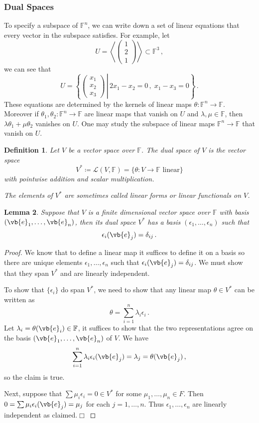 \documentclass{article}
\theoremstyle{plain}\theoremheaderfont{\normalfont\itshape}\theorembodyfont{\rmfamily}\theoremseparator{.}\newtheorem*{rem}{Remark}\newtheorem*{ex}{Example}\newtheorem*{proof}{Proof}\newtheorem*{altp}{Alternative proof}
\theoremstyle{plain}\theoremheaderfont{\normalfont\bfseries}\theorembodyfont{\rmfamily}\theoremseparator{.}\newtheorem{thm}{Theorem}[section]\newtheorem{lem}[thm]{Lemma}\newtheorem{prop}[thm]{Proposition}\newtheorem*{cor}{Corollary}\newtheorem{defn}[thm]{Definition}\newtheorem{clm}[thm]{Claim}\newtheorem{clminproof}{Claim}
\theoremstyle{break}\theoremheaderfont{\normalfont\itshape}\theorembodyfont{\rmfamily}\theoremseparator{.\medskip}\newtheorem*{proofskip}{Proof}\newtheorem*{exs}{Examples}\newtheorem*{rems}{Remarks}
\theoremstyle{break}\theoremheaderfont{\normalfont\bfseries}\theorembodyfont{\rmfamily}\theoremseparator{.\medskip}\newtheorem{lemskip}[thm]{Lemma}\newtheorem{defnskip}[thm]{Definition}\newtheorem{propskip}[thm]{Proposition}\newtheorem{thmskip}[thm]{Theorem}
\numberwithin{equation}{section}
\newcommand{\qed}{\hfill\ensuremath{\Box}}
\begin{document}
	\subsubsection{Dual Spaces}
	To specify a subspace of \(\mathbb{F}^n\), we can write down a set of linear equations that every vector in the subspace satisfies. For example, let
	\[U=\left\langle \begin{pmatrix}
		1 \\ 2 \\ 1
	\end{pmatrix}\right\rangle\subset\mathbb{F}^3\,,\]
	we can see that
	\[U=\left\{\left.\begin{pmatrix}
		x_1 \\ x_2 \\ x_3
	\end{pmatrix}\,\right|\,2x_1-x_2=0\,,\;x_1-x_3=0\right\}\,.\]
	These equations are determined by the kernels of linear maps \(\theta:\mathbb{F}^n\to\mathbb{F}\). Moreover if \(\theta_1,\theta_2:\mathbb{F}^n\to\mathbb{F}\) are linear maps that vanish on \(U\) and \(\lambda,\mu\in\mathbb{F}\), then \(\lambda\theta_1+\mu\theta_2\) vanishes on \(U\). One may study the subspace of linear maps \(\mathbb{F}^n\to\mathbb{F}\) that vanish on \(U\).
	\begin{defn}
		Let \(V\) be a vector space over \(\mathbb{F}\). The \textit{dual space} of \(V\) is the vector space
		\[V^*\coloneqq\mathcal{L}(V,\mathbb{F})=\{\theta:V\to\mathbb{F}\text{ linear}\}\]
		with pointwise addition and scalar multiplication.

		The elements of \(V^*\) are sometimes called \textit{linear forms} or \textit{linear functionals} on \(V\).
	\end{defn}
	\begin{lem}
		Suppose that \(V\) is a finite dimensional vector space over \(\mathbb{F}\) with basis \((\vb{e}_1,\dots,\vb{e}_n)\), then its dual space \(V^*\) has a basis \((\epsilon_1,\dots,\epsilon_n)\) such that
		\[\epsilon_i(\vb{e}_j)=\delta_{ij}\,.\]
	\end{lem}
	\begin{proof}
		We know that to define a linear map it suffices to define it on a basis so there are unique elements \(\epsilon_1,\dots,\epsilon_n\) such that \(\epsilon_i(\vb{e}_j)=\delta_{ij}\). We must show that they span \(V^*\) and are linearly independent.

		To show that \(\{\epsilon_i\}\) do span \(V^*\), we need to show that any linear map \(\theta\in V^*\) can be written as
		\[\theta=\sum_{i=1}^{n}\lambda_i\epsilon_i\,.\]
		Let \(\lambda_i=\theta(\vb{e}_i)\in\mathbb{F}\), it suffices to show that the two representations agree on the basis \((\vb{e}_1,\dots,\vb{e}_n)\) of \(V\). We have
		\[\sum_{i=1}^{n}\lambda_i\epsilon_i(\vb{e}_j)=\lambda_j=\theta(\vb{e}_j)\,,\]
		so the claim is true.

		Next, suppose that \(\sum \mu_i\epsilon_i=0\in V^*\) for some \(\mu_1,\dots,\mu_n\in F\). Then \(0=\sum \mu_i\epsilon_i(\vb{e}_j)=\mu_j\) for each \(j=1,\dots,n\). Thus \(\epsilon_1,\dots,\epsilon_n\) are linearly independent as claimed.\qed
	\end{proof}
\end{document}
